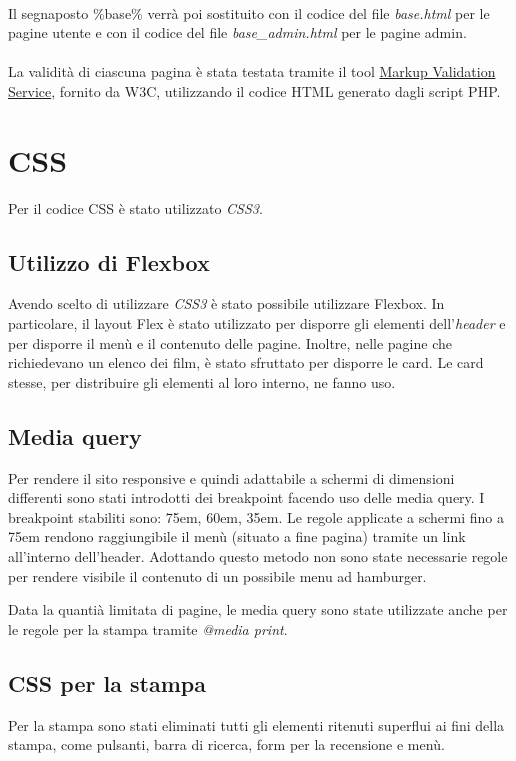 \documentclass[a4paper]{article}
\begin{document}
\paragraph{}Il segnaposto \%base\% verrà poi sostituito con il codice del file \textit{base.html} per le pagine utente e con il codice del file \textit{base\_admin.html} per le pagine admin.

\paragraph{}La validità di ciascuna pagina è stata testata tramite il tool \href{https://validator.w3.org/}{Markup Validation Service}, fornito da W3C, utilizzando il codice HTML generato dagli script PHP.

\section{CSS}
Per il codice CSS è stato utilizzato \textit{CSS3}.

\subsection{Utilizzo di Flexbox}
Avendo scelto di utilizzare \textit{CSS3} è stato possibile utilizzare Flexbox.
In particolare, il layout Flex è stato utilizzato per disporre gli elementi dell'\textit{header} e per disporre il menù e il contenuto delle pagine. 
Inoltre, nelle pagine che richiedevano un elenco dei film, è stato sfruttato per disporre le card.
Le card stesse, per distribuire gli elementi al loro interno, ne fanno uso.

\subsection{Media query}
Per rendere il sito responsive e quindi adattabile a schermi di dimensioni differenti sono stati introdotti dei breakpoint
facendo uso delle media query.
I breakpoint stabiliti sono: 75em, 60em, 35em.
Le regole applicate a schermi fino a 75em rendono raggiungibile il menù (situato a fine pagina) tramite un link all'interno dell'header.
Adottando questo metodo non sono state necessarie regole per rendere visibile il contenuto di un possibile menu ad hamburger.

Data la quantià limitata di pagine, le media query sono state utilizzate anche per le regole per la stampa tramite \textit{@media print}.

\subsection{CSS per la stampa}
Per la stampa sono stati eliminati tutti gli elementi ritenuti superflui ai fini della stampa, come pulsanti, barra di ricerca, form per la recensione e menù.
\end{document}
